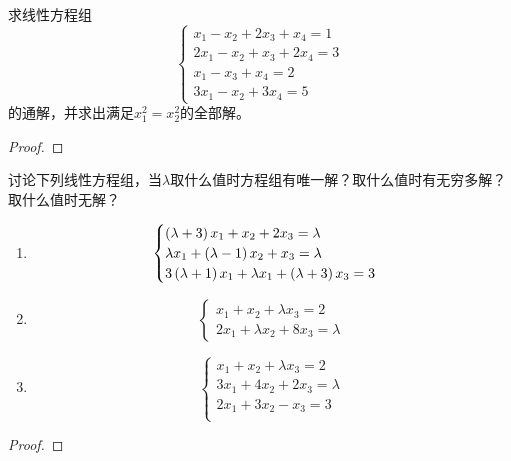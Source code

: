 \begin{problem}
求线性方程组
\begin{equation*}
    \begin{cases}
        x_1-x_2+2x_3+x_4=1  \\
        2x_1-x_2+x_3+2x_4=3 \\
        x_1-x_3+x_4=2       \\
        3x_1-x_2+3x_4=5
    \end{cases}
\end{equation*}
的通解，并求出满足\(x_1^2=x_2^2\)的全部解。
\end{problem}
\begin{proof}

\end{proof}

\begin{problem}
讨论下列线性方程组，当\(\lambda\)取什么值时方程组有唯一解？取什么值时有无穷多解？取什么值时无解？
\begin{enumerate}
    \item \begin{equation*}
              \begin{cases}
                  \left( \lambda+3 \right)x_1+x_2+2x_3=\lambda        \\
                  \lambda x_1+\left( \lambda-1 \right)x_2+x_3=\lambda \\
                  3\left( \lambda+1 \right)x_1+\lambda x_1+\left( \lambda+3 \right)x_3=3
              \end{cases}
          \end{equation*}
    \item
          {
          \begin{equation*}
              \begin{cases}
                  x_1+x_2+\lambda x_3=2 \\
                  2x_1+\lambda x_2+8x_3=\lambda
              \end{cases}
          \end{equation*}
          }
    \item \begin{equation*}
              \begin{cases}
                  x_1+x_2+\lambda x_3=2  \\
                  3x_1+4x_2+2x_3=\lambda \\
                  2x_1+3x_2-x_3=3        \\
              \end{cases}
          \end{equation*}
\end{enumerate}
\end{problem}
\begin{proof}

\end{proof}

